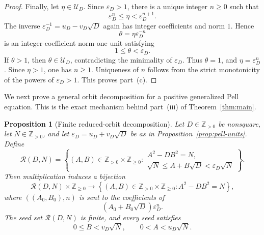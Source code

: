 \documentclass[a4paper,11pt]{amsart}
\numberwithin{equation}{section}
\newtheorem{proposition}[theorem]{Proposition}
\theoremstyle{definition}
\theoremstyle{remark}
\newcommand{\Z}{\mathbb Z}
\newcommand{\eps}{\varepsilon}
\newcommand{\Rcal}{\mathcal R}
\begin{document}
\begin{proof}
Finally, let \(\eta\in\mathcal U_D\).  Since \(\eps_D>1\), there is a unique
integer \(n\geq0\) such that
\begin{equation}\label{eq:archimedean-reduction-unit}
 \eps_D^n\leq\eta<\eps_D^{n+1}.
\end{equation}
The inverse \(\eps_D^{-1}=u_D-v_D\sqrt D\) again has integer coefficients
and norm \(1\).  Hence
\begin{equation*}
 \theta=\eta\eps_D^{-n}
\end{equation*}
is an integer-coefficient norm-one unit satisfying
\begin{equation}\label{eq:theta-range}
 1\leq\theta<\eps_D.
\end{equation}
If \(\theta>1\), then \(\theta\in\mathcal U_D\), contradicting the
minimality of \(\eps_D\).  Thus \(\theta=1\), and
\(\eta=\eps_D^n\).  Since \(\eta>1\), one has \(n\geq1\).  Uniqueness of
\(n\) follows from the strict monotonicity of the powers of \(\eps_D>1\).
This proves part~\textup{(c)}.
\end{proof}

We next prove a general orbit decomposition for a positive generalized Pell
equation.  This is the exact mechanism behind part~\textup{(iii)} of
Theorem~\ref{thm:main}.

\begin{proposition}[Finite reduced-orbit decomposition]\label{prop:generalized-pell}
Let \(D\in\Z_{>0}\) be nonsquare, let \(N\in\Z_{>0}\), and let
\(\eps_D=u_D+v_D\sqrt D\) be as in
Proposition~\ref{prop:pell-units}.  Define
\begin{equation}\label{eq:RDN}
 \Rcal(D,N)=
 \left\{
 (A,B)\in\Z_{>0}\times\Z_{\geq0}:
 \begin{array}{l}
 A^2-DB^2=N,\\[1mm]
 \sqrt N\leq A+B\sqrt D<\eps_D\sqrt N
 \end{array}
 \right\}.
\end{equation}
Then multiplication induces a bijection
\begin{equation}\label{eq:orbit-bijection}
 \Rcal(D,N)\times\Z_{\geq0}
 \longrightarrow
 \left\{(A,B)\in\Z_{>0}\times\Z_{\geq0}:A^2-DB^2=N\right\},
\end{equation}
where \(((A_0,B_0),n)\) is sent to the coefficients of
\begin{equation}\label{eq:general-orbit}
 (A_0+B_0\sqrt D)\eps_D^n.
\end{equation}
The seed set \(\Rcal(D,N)\) is finite, and every seed satisfies
\begin{equation}\label{eq:general-seed-bounds}
 0\leq B<v_D\sqrt N,
 \qquad
 0<A<u_D\sqrt N.
\end{equation}
\end{proposition}
\end{document}
